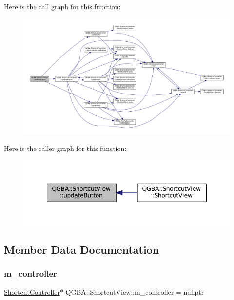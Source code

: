 Here is the call graph for this function\+:
\nopagebreak
\begin{figure}[H]
\begin{center}
\leavevmode
\includegraphics[width=350pt]{class_q_g_b_a_1_1_shortcut_view_a37a0e0d0e2720b112575f9b00739b7d4_cgraph}
\end{center}
\end{figure}
Here is the caller graph for this function\+:
\nopagebreak
\begin{figure}[H]
\begin{center}
\leavevmode
\includegraphics[width=348pt]{class_q_g_b_a_1_1_shortcut_view_a37a0e0d0e2720b112575f9b00739b7d4_icgraph}
\end{center}
\end{figure}


\subsection{Member Data Documentation}
\mbox{\label{class_q_g_b_a_1_1_shortcut_view_aa760e6e27fab7f02970364ea98a99b62}} 
\subsubsection{\texorpdfstring{m\+\_\+controller}{m\_controller}}
{\footnotesize\ttfamily \mbox{\hyperlink{class_q_g_b_a_1_1_shortcut_controller}{Shortcut\+Controller}}$\ast$ Q\+G\+B\+A\+::\+Shortcut\+View\+::m\+\_\+controller = nullptr\hspace{0.3cm}{\ttfamily [private]}}

